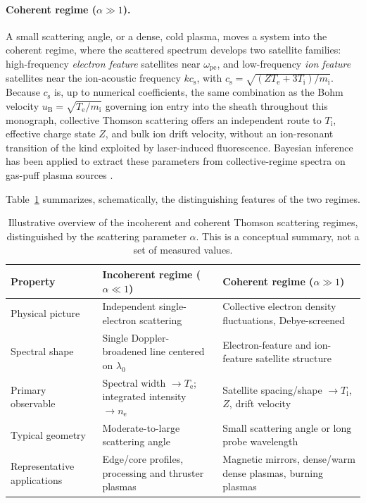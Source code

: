 \paragraph{Coherent regime ($\alpha \gg 1$).} A small scattering angle, or a dense, cold plasma, moves a system into the coherent regime, where the scattered spectrum develops two satellite families: high-frequency \emph{electron feature} satellites near $\omega_{\mathrm{pe}}$, and low-frequency \emph{ion feature} satellites near the ion-acoustic frequency $k c_{\mathrm{s}}$, with $c_{\mathrm{s}} = \sqrt{(Z T_{\mathrm{e}} + 3T_{\mathrm{i}})/m_{\mathrm{i}}}$. Because $c_{\mathrm{s}}$ is, up to numerical coefficients, the same combination as the Bohm velocity $u_{\mathrm{B}} = \sqrt{T_{\mathrm{e}}/m_{\mathrm{i}}}$ governing ion entry into the sheath throughout this monograph, collective Thomson scattering offers an independent route to $T_{\mathrm{i}}$, effective charge state $Z$, and bulk ion drift velocity, without an ion-resonant transition of the kind exploited by laser-induced fluorescence. Bayesian inference has been applied to extract these parameters from collective-regime spectra on gas-puff plasma sources \cite{ref0684}.

Table~\ref{tab:regimes} summarizes, schematically, the distinguishing features of the two regimes.

\begin{table}[htbp]
\centering
\caption{Illustrative overview of the incoherent and coherent Thomson scattering regimes, distinguished by the scattering parameter $\alpha$. This is a conceptual summary, not a set of measured values.}
\label{tab:regimes}
\begin{tabularx}{\linewidth}{@{}l X X@{}}
\toprule
Property & Incoherent regime ($\alpha \ll 1$) & Coherent regime ($\alpha \gg 1$) \\
\midrule
Physical picture & Independent single-electron scattering & Collective electron density fluctuations, Debye-screened \\
Spectral shape & Single Doppler-broadened line centered on $\lambda_0$ & Electron-feature and ion-feature satellite structure \\
Primary observable & Spectral width $\rightarrow T_{\mathrm{e}}$; integrated intensity $\rightarrow n_{\mathrm{e}}$ & Satellite spacing/shape $\rightarrow T_{\mathrm{i}}$, $Z$, drift velocity \\
Typical geometry & Moderate-to-large scattering angle & Small scattering angle or long probe wavelength \\
Representative applications & Edge/core profiles, processing and thruster plasmas & Magnetic mirrors, dense/warm dense plasmas, burning plasmas \\
\bottomrule
\end{tabularx}
\end{table}

